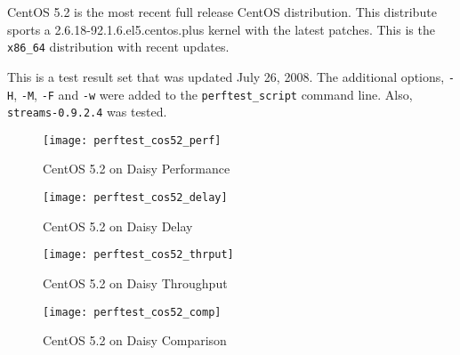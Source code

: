 \documentclass[letterpaper,final,notitlepage,twocolumn,10pt,twoside]{article}
\begin{document}
CentOS 5.2 is the most recent full release CentOS distribution.  This distribute sports a
2.6.18-92.1.6.el5.centos.plus kernel with the latest patches.  This is the \texttt{x86\_64}
distribution with recent updates.

This is a test result set that was updated July 26, 2008.  The additional options, \texttt{-H},
\texttt{-M}, \texttt{-F} and \texttt{-w} were added to the \texttt{perftest\_script} command line.
Also, \texttt{streams-0.9.2.4} was tested.

\begin{figure}[p]
\texttt{[image: perftest\_cos52\_perf]}
\caption[CentOS 5.2 on Daisy Performance]{CentOS 5.2 on Daisy Performance}
\label{figure:cos52perf}
\end{figure}

\begin{figure}[p]
\texttt{[image: perftest\_cos52\_delay]}
\caption[CentOS 5.2 on Daisy Delay]{CentOS 5.2 on Daisy Delay}
\label{figure:cos52delay}
\end{figure}

\begin{figure}[p]
\texttt{[image: perftest\_cos52\_thrput]}
\caption[CentOS 5.2 on Daisy Throughput]{CentOS 5.2 on Daisy Throughput}
\label{figure:cos52thrput}
\end{figure}

\begin{figure}[pt]
\texttt{[image: perftest\_cos52\_comp]}
\caption[CentOS 5.2 on Daisy Comparison]{CentOS 5.2 on Daisy Comparison}
\label{figure:cos52comp}
\end{figure}
\end{document}
